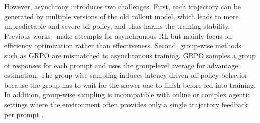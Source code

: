 However, asynchrony introduces two challenges. 
First, each trajectory can be generated by multiple versions of the old rollout model, which leads to more unpredictable and severe off-policy, and thus harms the training stability. Previous works~\citep{fu2025areal,noukhovitch2024asynchronous} make attempts for asynchronous RL but mainly focus on efficiency optimization rather than effectiveness.
Second, group-wise methods such as GRPO \citep{deepseek2024math, wang2022self} are mismatched to asynchronous training. 
GRPO samples a group of responses for each prompt and uses the group-level average for advantage estimation.
The group-wise sampling induces latency-driven off-policy behavior because the group has to wait for the slower one to finish before fed into training. In addition, group-wise sampling is incompatible with online or complex agentic settings where the environment often provides only a single trajectory feedback per prompt \citep{sutton2018reinforcement, schulman2017proximal, yao2022react, nakano2021webgpt}.




